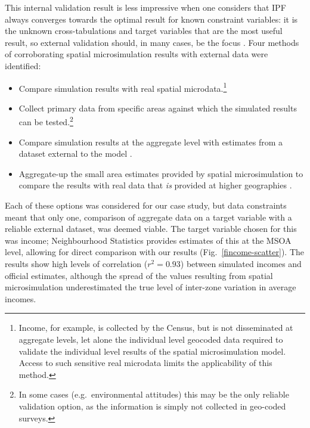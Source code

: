 \documentclass[a4paper, 11pt, twoside]{Thesis}
\begin{document}
This internal validation
result is less impressive when one considers that IPF always converges
towards the optimal result for known constraint variables:
it is the unknown cross-tabulations and
target variables that are the most useful result,
so external validation should, in many cases, be the focus
\citep{Morrissey2008, edwards2013validation}.
Four methods of corroborating spatial microsimulation results with external
data were identified:
\begin{itemize}
 \item Compare simulation results with real spatial microdata.\footnote{Income,
for example, is collected by the Census, but is not disseminated at aggregate
levels, let alone the individual level geocoded data required to validate the
individual level results of the spatial microsimulation model. Access to such
sensitive real microdata limits the applicability of this method.}
\item Collect primary data from specific areas against which the simulated
results can be tested.\footnote{In some cases (e.g.~environmental attitudes)
this may be the only reliable validation option, as the information is simply not
collected in geo-coded surveys.}
\item Compare simulation results at the aggregate level with estimates
from a dataset external to the model \citep{Morrissey2013}.
\item Aggregate-up the small area estimates provided by spatial microsimulation
to compare the results with real data that \emph{is} provided at higher
geographies \citep{Edwards2009}.
\end{itemize}
Each of these options was considered for our case study,
but data constraints meant that only one, comparison of aggregate data
on a target variable with a reliable external dataset, was deemed viable.
The target variable chosen for this was income; Neighbourhood Statistics
provides estimates of this at the MSOA level, allowing
for direct comparison with our results (Fig.~\ref{fincome-scatter}). The results show
high levels of correlation ($r^2 = 0.93$) between simulated incomes and official
estimates, although the spread of the values resulting from spatial microsimulation
underestimated the true level of inter-zone variation in average incomes.
\end{document}
